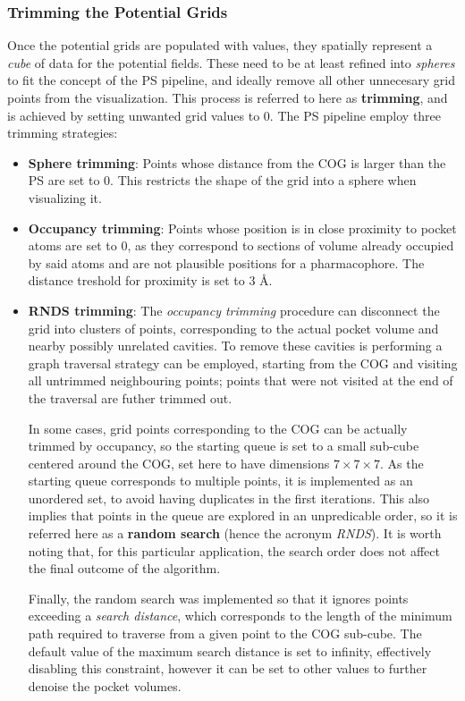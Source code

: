     \subsubsection{Trimming the Potential Grids}
      Once the potential grids are populated with values, they spatially represent a \textit{cube} of data for the potential fields. These need to be at least refined into \textit{spheres} to fit the concept of the PS pipeline, and ideally remove all other unnecesary grid points from the visualization. This process is referred to here as \textbf{trimming}, and is achieved by setting unwanted grid values to $0$. The PS pipeline employ three trimming strategies:

      \begin{itemize}
        \item \textbf{Sphere trimming}: Points whose distance from the COG is larger than the PS are set to $0$. This restricts the shape of the grid into a sphere when visualizing it.

        \item \textbf{Occupancy trimming}: Points whose position is in close proximity to pocket atoms are set to $0$, as they correspond to sections of volume already occupied by said atoms and are not plausible positions for a pharmacophore. The distance treshold for proximity is set to {3 \AA}.

        \item \textbf{RNDS trimming}: The \textit{occupancy trimming} procedure can disconnect the grid into clusters of points, corresponding to the actual pocket volume and nearby possibly unrelated cavities. To remove these cavities is performing a graph traversal strategy can be employed, starting from the COG and visiting all untrimmed neighbouring points; points that were not visited at the end of the traversal are futher trimmed out.

        In some cases, grid points corresponding to the COG can be actually trimmed by occupancy, so the starting queue is set to a small sub-cube centered around the COG, set here to have dimensions $7 \times 7 \times 7$. As the starting queue corresponds to multiple points, it is implemented as an unordered set, to avoid having duplicates in the first iterations. This also implies that points in the queue are explored in an unpredicable order, so it is referred here as a \textbf{random search} (hence the acronym \textit{RNDS}). It is worth noting that, for this particular application, the search order does not affect the final outcome of the algorithm.

        Finally, the random search was implemented so that it ignores points exceeding a \textit{search distance}, which corresponds to the length of the minimum path required to traverse from a given point to the COG sub-cube. The default value of the maximum search distance is set to infinity, effectively disabling this constraint, however it can be set to other values to further denoise the pocket volumes.

      \end{itemize}


